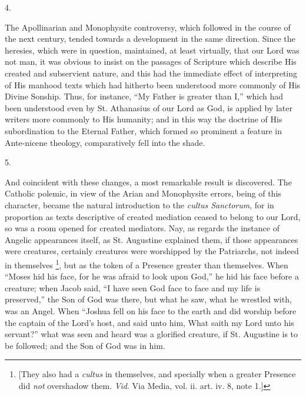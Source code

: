 4.

The Apollinarian and Monophysite controversy, which
followed in the course of the next century, tended
towards a development in the same direction. Since the
heresies, which were in question, maintained, at least
virtually, that our Lord was not man, it was obvious to
insist on the passages of Scripture which describe His
created and subservient nature, and this had the
immediate effect of interpreting of His manhood texts
which had hitherto been understood more commonly of His
Divine Sonship. Thus, for instance, ``My Father is
greater than I,'' which had been understood even by
St. Athanasius of our Lord as God, is applied by later
writers more commonly to His humanity; and in this way
the doctrine of His subordination to the Eternal Father,
which formed so prominent a feature in Ante-nicene
theology, comparatively fell into the shade.

5.

And coincident with these changes, a most remarkable
result is discovered. The Catholic polemic, in view of
the Arian and Monophysite errors, being of this
character, became the natural introduction to the \emph{cultus
Sanctorum}, for in proportion as texts descriptive of
created mediation ceased to belong to our Lord, so was a
room opened for created mediators. Nay, as regards the
instance of Angelic appearances itself, as St. Augustine
explained them, if those appearances were creatures,
certainly creatures were worshipped by the Patriarchs,
not indeed in themselves \footnote{[They also had a \emph{cultus}
in themselves, and specially when a greater Presence did \emph{not}
overshadow them. \emph{Vid}. Via
Media, vol. ii. art. iv. 8,
note 1.]}, but as the token of a
Presence greater than themselves. When ``Moses hid
his face, for he was afraid to look upon God,'' he
hid his face before a creature; when Jacob said, ``I
have seen God face to face and my life is
preserved,'' the Son of God was there, but what he
saw, what he wrestled with, was an Angel. When
``Joshua fell on his face to the earth and did
worship before the captain of the Lord's host, and said
unto him, What saith my Lord unto his servant?'' what
was seen and heard was a glorified creature, if St.
Augustine is to be followed; and the Son of God was in
him.

